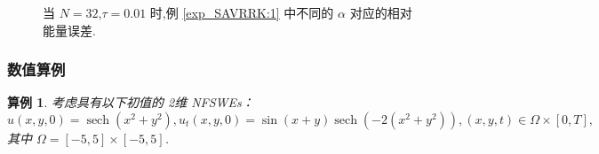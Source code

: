\documentclass[aspectratio=169]{beamer}
\newtheorem{myexample}{算例}[section] %
\numberwithin{theorem}{section} %
\numberwithin{equation}{section}%
\numberwithin{figure}{section}%
\numberwithin{table}{section}%
\begin{document}
\begin{frame}%
	\begin{figure}[H]
		\begin{center}
		\caption{当 $N=32$,$\tau=0.01$ 时,例 \ref{exp_SAVRRK:1} 中不同的 $\alpha$ 对应的相对能量误差.}
		\label{fig_SAVRRK:4-2}
		\end{center}
		\end{figure}
\end{frame}
\begin{frame}\frametitle{数值算例}
	\begin{myexample}\label{exp_SAVRRK:2}
		考虑具有以下初值的 2维 NFSWEs：
		\begin{equation*}
		u(x, y, 0)=\operatorname{sech}\left(x^2+y^2\right), u_t(x, y, 0)=\sin (x+y) \operatorname{sech}\left(-2\left(x^2+y^2\right)\right),(x, y, t) \in \Omega \times[0, T],
		\end{equation*}
		其中 $\Omega=[-5,5] \times[-5,5]$.
		\end{myexample}
\end{frame}
\end{document}

